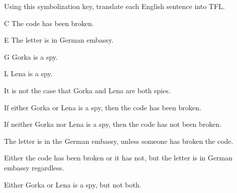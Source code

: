 \begin{comment}
\begin{earg}
\item John Coltrane played tenor and soprano sax. 
\item Neither Miles Davis nor John Coltrane played tuba. 
\item John Coltrane did not play both tenor sax and tuba. 
\item John Coltrane did not play tenor sax unless he also played soprano sax. 
\item John Coltrane did not play tuba, but Miles Davis did. 
\item Miles Davis played trumpet only if he also played tuba. 

\item If Miles Davis played trumpet, then John Coltrane played at least one of these three instruments: tenor sax, soprano sax, or tuba. 

\item It is not the case that if John Coltrane played tuba then Miles Davis played trumpet or tuba. 

\item Miles Davis and John Coltrane both played tuba if and only if Coltrane did not play tenor sax and Miles Davis did not play trumpet. 
\end{earg}
\end{comment}

\problempart
\label{pr.spies}
Using this symbolization key, translate each English sentence into TFL.
\begin{ekey}
\item[C] The code has been broken.
\item[E] The letter is in German embassy.
\item[G] Gorka is a spy.
\item[L] Lena is a spy.
\end{ekey}
\begin{earg}
\item It is not the case that Gorka and Lena are both spies.
\item If either Gorka or Lena is a spy, then the code has been broken.
\item If neither Gorka nor Lena is a spy, then the code has not been broken.
\item The letter is in the German embassy, unless someone has broken the code.
\item Either the code has been broken or it has not, but the letter is in German embassy regardless.
\item Either Gorka or Lena is a spy, but not both.
\end{earg}

